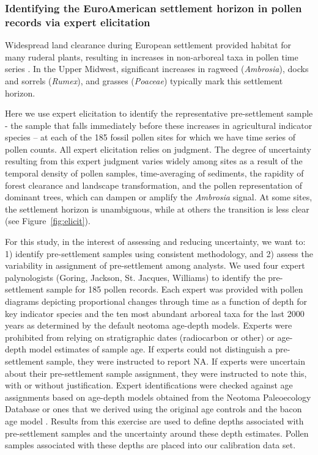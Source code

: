 \documentclass[12pt]{article}
\begin{document}
\subsubsection{Identifying the EuroAmerican settlement horizon in pollen records via expert elicitation}

Widespread land clearance during European settlement provided habitat
for many ruderal plants, resulting in increases in non-arboreal taxa
in pollen time series  \citep{mcandrews1988human}. In the Upper Midwest,
significant increases in ragweed (\textit{Ambrosia}), docks and
sorrels (\textit{Rumex}), and grasses (\textit{Poaceae}) typically
mark this settlement horizon.

Here we use expert elicitation to identify the representative
pre-settlement sample - the sample that falls immediately before these
increases in agricultural indicator species -- at each of the 185
fossil pollen sites for which we have time series of pollen
counts. All expert elicitation relies on judgment. The degree of
uncertainty resulting from this expert judgment varies widely among
sites as a result of the temporal density of pollen samples,
time-averaging of sediments, the rapidity of forest clearance and
landscape transformation, and the pollen representation of dominant
trees, which can dampen or amplify the \textit{Ambrosia} signal. At
some sites, the settlement horizon is unambiguous, while at others the
transition is less clear (see Figure~\ref{fig:elicit}).

For this study, in the interest of assessing and reducing uncertainty,
we want to: 1) identify pre-settlement samples using consistent
methodology, and 2) assess the variability in assignment of
pre-settlement among analysts. We used four expert palynologists
(Goring, Jackson, St. Jacques, Williams) to identify the
pre-settlement sample for 185 pollen records. Each expert was provided
with pollen diagrams depicting proportional changes through time as a
function of depth for key indicator species and the ten most abundant
arboreal taxa for the last 2000 years as determined by the default
neotoma age-depth models. Experts were prohibited from relying on
stratigraphic dates (radiocarbon or other) or age-depth model
estimates of sample age. If experts could not distinguish a
pre-settlement sample, they were instructed to report NA. If experts
were uncertain about their pre-settlement sample assignment, they were
instructed to note this, with or without justification. Expert
identifications were checked against age assignments based on
age-depth models obtained from the Neotoma Paleoecology Database or
ones that we derived using the original age controls and the bacon age
model \citep{blaauw2011flexible}.  Results from this exercise are used
to define depths associated with pre-settlement samples and the
uncertainty around these depth estimates. Pollen samples associated
with these depths are placed into our calibration data set.
\end{document}
